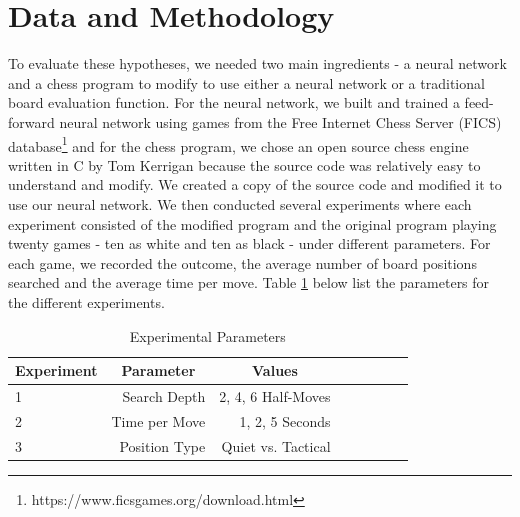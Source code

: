 \documentclass[12pt]{article}
\begin{document}
\section{Data and Methodology}
To evaluate these hypotheses, we needed two main ingredients - a neural network and a chess program to modify to use either a neural network or a traditional board evaluation function. For the neural network, we built and trained a feed-forward neural network using games from the Free Internet Chess Server (FICS) database\footnote{https://www.ficsgames.org/download.html} and for the chess program, we chose an open source chess engine written in C by Tom Kerrigan\cite{tscp} because the source code was relatively easy to understand and modify. We created a copy of the source code and modified it to use our neural network. We then conducted several experiments where each experiment consisted of the modified program and the original program playing twenty games - ten as white and ten as black - under different parameters. For each game, we recorded the outcome, the average number of board positions searched and the average time per move. Table \ref{t1} below list the parameters for the different experiments.

\begin{table}[h]
	\centering
	\caption{Experimental Parameters} \label{t1}
	\begin{tabular}{l  r r r r r r r}
		\multicolumn{1}{c}{Experiment} & \multicolumn{1}{c}{Parameter} &  \multicolumn{1}{c}{Values}\\ \hline
		1 & Search Depth & 2, 4, 6 Half-Moves \\
		2 & Time per Move & 1, 2, 5 Seconds \\
		3 & Position Type & Quiet vs. Tactical \\
		\hline
	\end{tabular}
\end{table}
\end{document}

